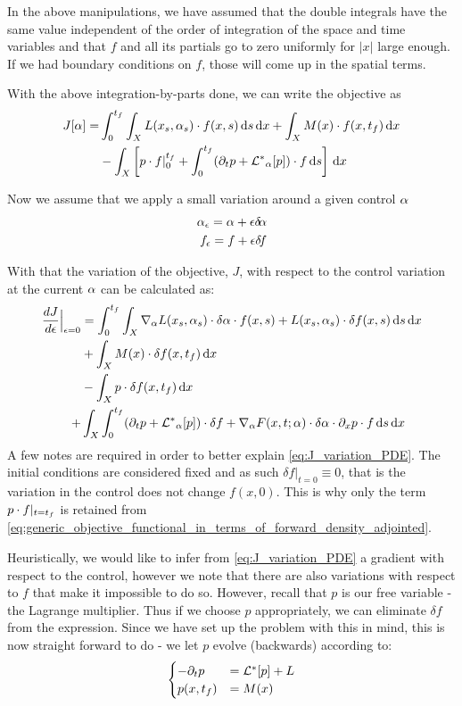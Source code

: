 In the above manipulations, we have assumed that the double integrals have the
same value independent of the order of integration of the space and time
variables  and that $f$ and all its partials go to zero uniformly for $|x|$
large enough. If we had boundary conditions on $f$, those will come up in the
spatial terms.

With the above integration-by-parts done, we can write the objective as
\begin{align}
J[\alpha] =& \int_0^{ t_f }\int_X L(x_s, \alpha_s) \cdot f(x,s) \, \mathrm{d} s\, \mathrm{d} x 
+ \int_X  M(x)\cdot f(x,{ t_f }) \, \mathrm{d} x \notag
\\ &- 
\int_X  \left[ p\cdot f|_0^{ t_f }  +
    \int_0^{ t_f }  ({\partial}_t p  + { { \mathcal{L} }^* }_{\alpha} [p]) \cdot f  \, \mathrm{d} s \right] \, \mathrm{d} x 
\label{eq:generic_objective_functional_in_terms_of_forward_density_adjointed}
\end{align}

Now we assume that we apply a small variation around a given control $\alpha$
\begin{align*}
\alpha_{\epsilon} = \alpha + {\epsilon} { \delta\! \alpha}
\\
f_{\epsilon} = f + {\epsilon} { \delta\! f}
\end{align*}

With that the variation of the objective, $J$, with respect to the control
variation at the current $\alpha$ can be calculated as:
\begin{align}
\frac {dJ}{d{\epsilon}} \Big|_{{\epsilon} = 0} &= 
\int_0^{ t_f }\int_X { \nabla }_\alpha L(x_s, \alpha_s) \cdot \delta \alpha \cdot f(x,s) +
L(x_s, \alpha_s) \cdot \delta f(x,s)
\, \mathrm{d} s\, \mathrm{d} x 
\notag \\
&+ 
\int_X  M(x)\cdot \delta f(x,{ t_f }) \, \mathrm{d} x \notag
\\ &- 
\int_X    p\cdot \delta f(x, { t_f })     \, \mathrm{d} x  \notag \\+& 
    \int_X \int_0^{ t_f }  ({\partial}_t p  + { { \mathcal{L} }^* }_{\alpha} [p]) \cdot \delta f 
    + { \nabla }_\alpha F(x,t;\alpha) \cdot \delta \alpha \cdot  {\partial}_xp \cdot f 
     \, \mathrm{d} s
    \, \mathrm{d} x
\label{eq:J_variation_PDE}
\end{align}
A few notes are required in order to better explain \cref{eq:J_variation_PDE}.
The initial conditions are considered fixed and as such $\delta f |_{t=0} \equiv
0 $, that is the variation in the control does not change $f(x, 0)$. This is
why only the term $p\cdot f|_{t={ t_f }}$ is retained from \cref{eq:generic_objective_functional_in_terms_of_forward_density_adjointed}.

Heuristically, we would like to infer from \cref{eq:J_variation_PDE} a gradient
with respect to the control, however we note that there are also variations with
respect to $f$ that make it impossible to do so. However, recall that $p$ is
our free variable - the Lagrange multiplier. Thus if we choose $p$
appropriately, we can eliminate $\delta f$ from the expression. Since we
have set up the problem with this in mind, this is now straight forward
to do - we let $p$ evolve (backwards) according to:
\begin{equation}
\begin{cases}
-{\partial}_t p &= { { \mathcal{L} }^* }[p] + L
\\
p(x, { t_f }) &=  M(x)  
\end{cases}
\label{eq:generic_adjoint_PDE}
\end{equation}

